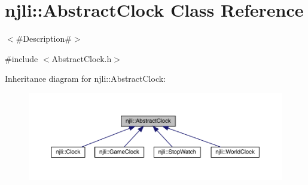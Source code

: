 \hypertarget{classnjli_1_1_abstract_clock}{}\section{njli\+:\+:Abstract\+Clock Class Reference}
\label{classnjli_1_1_abstract_clock}


$<$\#\+Description\#$>$  




{\ttfamily \#include $<$Abstract\+Clock.\+h$>$}



Inheritance diagram for njli\+:\+:Abstract\+Clock\+:\nopagebreak
\begin{figure}[H]
\begin{center}
\leavevmode
\includegraphics[width=350pt]{classnjli_1_1_abstract_clock__inherit__graph}
\end{center}
\end{figure}
